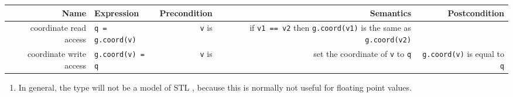 
\noindent 
 \begin{tabularx}{15cm}{RlRRR} 
   \\ 
   \hline 
   \bf  Name    &
   \bf  Expression &
   \bf  Precondition&
   \bf  Semantics &
   \bf  Postcondition
   \\ 
   \hline
    coordinate read access & 
    {\tt q = g.coord(v)} &
    {\tt v} is  &
    if {\tt v1 == v2} then {\tt g.coord(v1)} is the same as
    {\tt g.coord(v2)} &
    \\
    coordinate write access &
    {\tt g.coord(v) = q} &
    {\tt v} is  &
    set the coordinate of {\tt v} to {\tt q} &
    {\tt g.coord(v)} is equal to {\tt q}
    \\
   \hline
\end{tabularx}

\W{}



\begin{enumerate}
\item {} 
In general, the type  will not be a model
of STL ,
because this is normally not useful for floating point values.
\end{enumerate}



